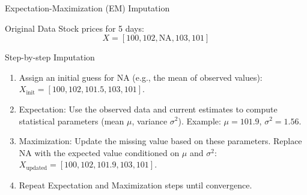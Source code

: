 \documentclass{beamer}
\begin{document}
\begin{frame}{Expectation-Maximization (EM) Imputation}
   \begin{block}{Original Data}
       Stock prices for 5 days:
       \[
       X = [100, 102, \text{NA}, 103, 101]
       \]
   \end{block}

   \begin{block}{Step-by-step Imputation}
       \begin{enumerate}
           \item Assign an initial guess for $\text{NA}$ (e.g., the mean of observed values):
           $X_{\text{init}} = [100, 102, 101.5, 103, 101]$.

           \item Expectation: Use the observed data and current estimates to compute statistical parameters (mean $\mu$, variance $\sigma^2$).
           Example: $\mu = 101.9$, $\sigma^2 = 1.56$.

           \item Maximization: Update the missing value based on these parameters. Replace $\text{NA}$ with the expected value conditioned on $\mu$ and $\sigma^2$:\\
           $X_{\text{updated}} = [100, 102, \mathbf{101.9}, 103, 101]$.

           \item Repeat Expectation and Maximization steps until convergence.
       \end{enumerate}
   \end{block}

\end{frame}
\end{document}
